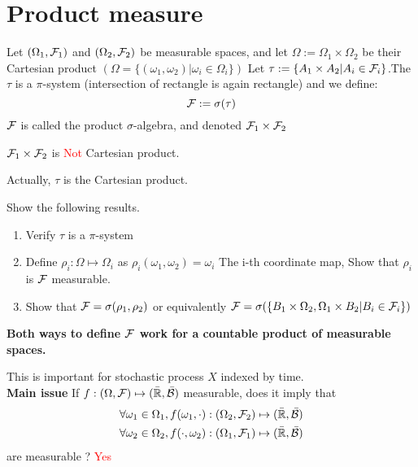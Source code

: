 \newpage
\section{Product measure}
Let $(\Omega_1, \mathcal{F}_1)$ and $(\Omega_2, \mathcal{F}_2)$ be measurable spaces, and let $\Omega:= \Omega_1 \times \Omega_2$ be their Cartesian product $(\Omega = \{(\omega_1, \omega_2)|\omega_i \in \Omega_i\})$ Let $\tau:= \{A_1 \times A_2 | A_i\in \mathcal{F}_i\}$.The $\tau$ is a $\pi$-system (intersection of rectangle is again rectangle) and we define:
\begin{equation*}
    \mathcal{F} := \sigma(\tau)
\end{equation*}$\mathcal{F}$ is called the product $\sigma$-algebra, and denoted $\mathcal{F}_1 \times \mathcal{F}_2$
\begin{rem}
$\mathcal{F}_1 \times \mathcal{F}_2$ is \textcolor{red}{Not} Cartesian product.
\end{rem}
Actually, $\tau$ is the Cartesian product.
\begin{ex}
Show the following results.
\begin{enumerate}
    \item Verify $\tau$ is a $\pi$-system
    \item Define $\rho_i : \Omega \mapsto \Omega_i$ as $\rho_i(\omega_1, \omega_2) = \omega_i$ The i-th coordinate map, Show that $\rho_i$ is $\mathcal{F}$ measurable.
    \item Show that $\mathcal{F} = \sigma(\rho_1,\rho_2)$ or equivalently $\mathcal{F} = \sigma(\{B_1\times \Omega_2, \Omega_1\times B_2|B_i \in \mathcal{F}_i \})$
\end{enumerate}
\end{ex}
\begin{rem}
\textbf{Both ways to define $\mathcal{F}$ work for a countable product of measurable spaces.}
\end{rem}This is important for stochastic process $X$ indexed by time. \\[0.5cm]
\textbf{Main issue} If $f: (\Omega, \mathcal{F}) \mapsto (\bar{\mathbb{R}}, \bar{\mathcal{B}})$ measurable, does it imply that 
\begin{align*}
    \forall \omega_1 \in \Omega_1, f(\omega_1, \cdot): (\Omega_2, \mathcal{F}_2) \mapsto (\bar{\mathbb{R}}, \bar{\mathcal{B}}) \\
    \forall \omega_2 \in \Omega_2, f(\cdot,\omega_2): (\Omega_1, \mathcal{F}_1) \mapsto (\bar{\mathbb{R}}, \bar{\mathcal{B}})
\end{align*} are measurable ? \textcolor{red}{Yes}

